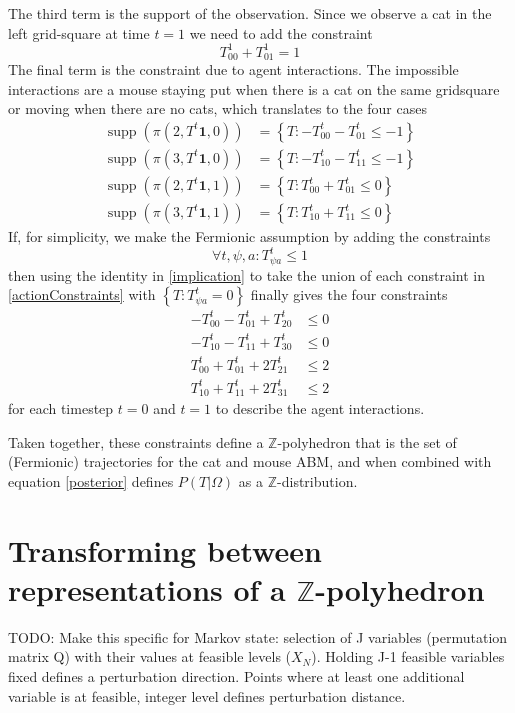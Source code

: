 \documentclass{article}
\DeclareMathOperator\supp{supp}
\begin{document}
The third term is the support of the observation. Since we observe a cat in the left grid-square at time $t=1$ we need to add the constraint
\[
T^1_{0 0} + T^1_{0 1} = 1
\]
The final term is the constraint due to agent interactions. The impossible interactions are a mouse staying put when there is a cat on the same gridsquare or moving when there are no cats, which translates to the four cases
\begin{equation}
\begin{aligned}
\supp(\pi(2,T^t\mathbf{1},0)) &= \left\{ T: -T^t_{0 0} - T^t_{0 1} \le -1 \right\}\\
\supp(\pi(3,T^t\mathbf{1},0)) &= \left\{ T: -T^t_{1 0} - T^t_{1 1} \le -1 \right\}\\
\supp(\pi(2,T^t\mathbf{1},1)) &= \left\{ T: T^t_{0 0} + T^t_{0 1} \le 0 \right\}\\
\supp(\pi(3,T^t\mathbf{1},1)) &= \left\{ T: T^t_{1 0} + T^t_{1 1} \le 0 \right\}
\end{aligned}
\label{actionConstraints}
\end{equation}
If, for simplicity, we make the Fermionic assumption by adding the constraints
\[
\forall t,\psi,a: T^t_{\psi a} \le 1
\]
then using the identity in \eqref{implication} to take the union of each constraint in \eqref{actionConstraints} with $\left\{T: T^t_{\psi a} = 0\right\}$ finally gives the four constraints
\[
\begin{aligned}
-T^t_{0 0} - T^t_{0 1} + T^t_{2 0} & \le 0\\
-T^t_{1 0} - T^t_{1 1} + T^t_{3 0} & \le 0\\
T^t_{0 0} + T^t_{0 1} + 2T^t_{2 1} & \le 2 \\
T^t_{1 0} + T^t_{1 1} + 2T^t_{3 1} & \le 2
\end{aligned}
\]
for each timestep $t=0$ and $t=1$ to describe the agent interactions.

Taken together, these constraints define a $\mathbb{Z}$-polyhedron that is the set of (Fermionic) trajectories for the cat and mouse ABM, and when combined with equation \eqref{posterior} defines $P(T|\Omega)$ as a $\mathbb{Z}$-distribution.

\section{Transforming between representations of a $\mathbb{Z}$-polyhedron}

TODO: Make this specific for Markov state: selection of J variables (permutation matrix Q) with their values at feasible levels ($X_N$). Holding J-1 feasible variables fixed defines a perturbation direction. Points where at least one additional variable is at feasible, integer level defines perturbation distance.
\end{document}

